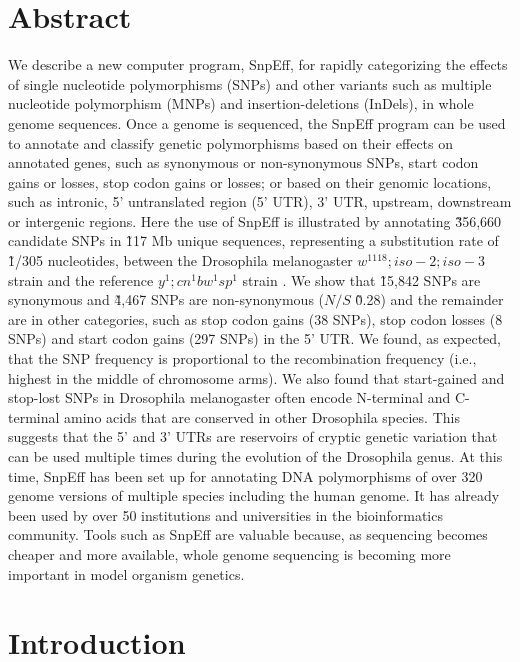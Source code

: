 \section{Abstract}

We describe a new computer program, SnpEff, for rapidly categorizing the effects of single nucleotide polymorphisms (SNPs) and other variants such as multiple nucleotide polymorphism (MNPs) and insertion-deletions (InDels), in whole genome sequences. Once a genome is sequenced, the SnpEff program can be used to annotate and classify genetic polymorphisms based on their effects on annotated genes, such as synonymous or non-synonymous SNPs, start codon gains or losses, stop codon gains or losses; or based on their genomic locations, such as intronic, 5' untranslated region (5' UTR), 3' UTR, upstream, downstream or intergenic regions. Here the use of SnpEff is illustrated by annotating \~356,660 candidate SNPs in \~117 Mb unique sequences, representing a substitution rate of \~1/305 nucleotides, between the Drosophila melanogaster $w^{1118} ; iso-2; iso-3$ strain and the reference $y^1 ; cn^1 bw^1 sp^1$ strain \cite{platts2009massively}. We show that \~15,842 SNPs are synonymous and \~4,467 SNPs are non-synonymous ($N/S$ \~0.28) and the remainder are in other categories, such as stop codon gains (38 SNPs), stop codon losses (8 SNPs) and start codon gains (297 SNPs) in the 5' UTR. We found, as expected, that the SNP frequency is proportional to the recombination frequency (i.e., highest in the middle of chromosome arms).  We also found that start-gained and stop-lost SNPs in Drosophila melanogaster often encode N-terminal and C-terminal amino acids that are conserved in other Drosophila species. This suggests that the 5' and 3' UTRs are reservoirs of cryptic genetic variation that can be used multiple times during the evolution of the Drosophila genus. At this time, SnpEff has been set up for annotating DNA polymorphisms of over 320 genome versions of multiple species including the human genome. It has already been used by over 50 institutions and universities in the bioinformatics community. Tools such as SnpEff are valuable because, as sequencing becomes cheaper and more available, whole genome sequencing is becoming more important in model organism genetics.

\section{Introduction}

